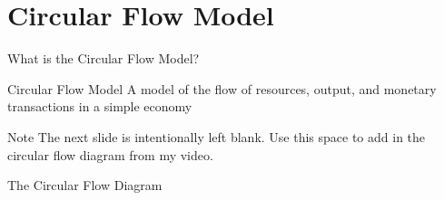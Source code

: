 \documentclass{beamer}
\begin{document}
\section{Circular Flow Model}

\begin{frame}{What is the Circular Flow Model?}

\begin{block}{Circular Flow Model}
A model of the flow of resources, output, and monetary transactions in a simple economy
\end{block}

\begin{alertblock}{Note}
The next slide is intentionally left blank. Use this space to add in the circular flow diagram from my video.
\end{alertblock}
\end{frame}

\begin{frame}{The Circular Flow Diagram}

\end{frame}


\end{document}
